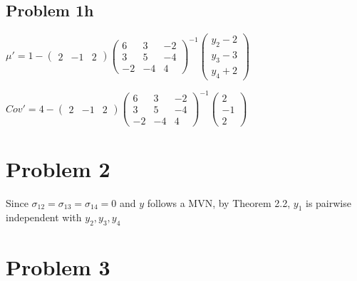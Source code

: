 \documentclass[a4paper]{article}
\begin{document}
\subsection*{Problem 1h}

$\mu' = 1 - \begin{pmatrix} 2 & -1 & 2 \end{pmatrix} \begin{pmatrix} 6 & 3 & -2\\ 3 & 5 & -4 \\ -2 & -4 & 4 \end{pmatrix}^{-1} \begin{pmatrix} y_2-2\\ y_3-3\\ y_4+2 \end{pmatrix} $

$Cov' = 4 - \begin{pmatrix} 2 & -1 & 2 \end{pmatrix} \begin{pmatrix} 6 & 3 & -2\\ 3 & 5 & -4 \\ -2 & -4 & 4 \end{pmatrix}^{-1} \begin{pmatrix} 2 \\ -1 \\ 2 \end{pmatrix}$








\section*{Problem 2}
Since $\sigma_{12} = \sigma_{13} = \sigma_{14} = 0$ and $y$ follows a MVN, by Theorem 2.2, $y_1$ is pairwise independent with $y_2,y_3,y_4$

\section*{Problem 3}
\end{document}
